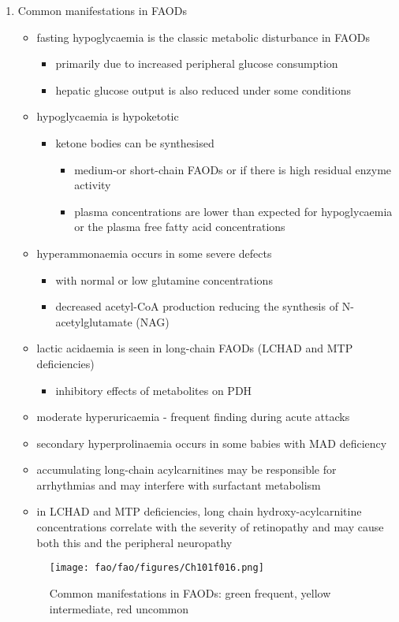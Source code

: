 \documentclass{scrartcl}
\begin{document}
\begin{enumerate}
\item Common manifestations in FAODs
\label{sec:orga74db16}
\begin{itemize}
\item fasting hypoglycaemia is the classic metabolic disturbance in FAODs
\begin{itemize}
\item primarily due to increased peripheral glucose consumption
\item hepatic glucose output is also reduced under some conditions
\end{itemize}
\item hypoglycaemia is hypoketotic
\begin{itemize}
\item ketone bodies can be synthesised
\begin{itemize}
\item medium-or short-chain FAODs or if there is high residual enzyme activity
\item plasma concentrations are lower than expected for hypoglycaemia or the plasma free fatty acid concentrations
\end{itemize}
\end{itemize}
\item hyperammonaemia occurs in some severe defects
\begin{itemize}
\item with normal or low glutamine concentrations
\item decreased acetyl-CoA production reducing the synthesis of N-acetylglutamate (NAG)
\end{itemize}
\item lactic acidaemia is seen in long-chain FAODs (LCHAD and MTP deficiencies)
\begin{itemize}
\item inhibitory effects of metabolites on PDH
\end{itemize}
\item moderate hyperuricaemia - frequent finding during acute attacks
\item secondary hyperprolinaemia occurs in some babies with MAD deficiency
\item accumulating long-chain acylcarnitines may be responsible for
arrhythmias and may interfere with surfactant metabolism
\item in LCHAD and MTP deficiencies, long chain hydroxy-acylcarnitine
concentrations correlate with the severity of retinopathy and may
cause both this and the peripheral neuropathy
\end{itemize}

\begin{figure}[htbp]
\centering
\texttt{[image: fao/fao/figures/Ch101f016.png]}
\caption{\label{fig:orgb6881d8}Common manifestations in FAODs: green frequent, yellow intermediate, red uncommon}
\end{figure}
\end{enumerate}
\end{document}
